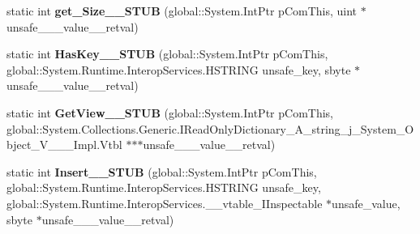 \begin{DoxyCompactItemize}
static int {\bfseries get\+\_\+\+Size\+\_\+\+\_\+\+S\+T\+UB} (global\+::\+System.\+Int\+Ptr p\+Com\+This, uint $\ast$unsafe\+\_\+\+\_\+\+\_\+value\+\_\+\+\_\+retval)
\item 
\mbox{\label{struct_system_1_1_collections_1_1_generic_1_1_i_dictionary___a__string__j___system___object___v_______impl_1_1_vtbl_a972ac0c13db7e6d564603288e0e2433d}} 
static int {\bfseries Has\+Key\+\_\+\+\_\+\+S\+T\+UB} (global\+::\+System.\+Int\+Ptr p\+Com\+This, global\+::\+System.\+Runtime.\+Interop\+Services.\+H\+S\+T\+R\+I\+NG unsafe\+\_\+key, sbyte $\ast$unsafe\+\_\+\+\_\+\+\_\+value\+\_\+\+\_\+retval)
\item 
\mbox{\label{struct_system_1_1_collections_1_1_generic_1_1_i_dictionary___a__string__j___system___object___v_______impl_1_1_vtbl_a9882de5701b0ac3eaecba10f136a31ef}} 
static int {\bfseries Get\+View\+\_\+\+\_\+\+S\+T\+UB} (global\+::\+System.\+Int\+Ptr p\+Com\+This, global\+::\+System.\+Collections.\+Generic.\+I\+Read\+Only\+Dictionary\+\_\+\+A\+\_\+string\+\_\+j\+\_\+\+System\+\_\+\+Object\+\_\+\+V\+\_\+\+\_\+\+\_\+\+Impl.\+Vtbl $\ast$$\ast$$\ast$unsafe\+\_\+\+\_\+\+\_\+value\+\_\+\+\_\+retval)
\item 
\mbox{\label{struct_system_1_1_collections_1_1_generic_1_1_i_dictionary___a__string__j___system___object___v_______impl_1_1_vtbl_a8281771d0d8c28e4e4779badba319d69}} 
static int {\bfseries Insert\+\_\+\+\_\+\+S\+T\+UB} (global\+::\+System.\+Int\+Ptr p\+Com\+This, global\+::\+System.\+Runtime.\+Interop\+Services.\+H\+S\+T\+R\+I\+NG unsafe\+\_\+key, global\+::\+System.\+Runtime.\+Interop\+Services.\+\_\+\+\_\+vtable\+\_\+\+I\+Inspectable $\ast$unsafe\+\_\+value, sbyte $\ast$unsafe\+\_\+\+\_\+\+\_\+value\+\_\+\+\_\+retval)
\item 
\mbox{\label{struct_system_1_1_collections_1_1_generic_1_1_i_dictionary___a__string__j___system___object___v_______impl_1_1_vtbl_a55303b8c8139157c583dfda7c75fb5bb}} 

\end{DoxyCompactItemize}
